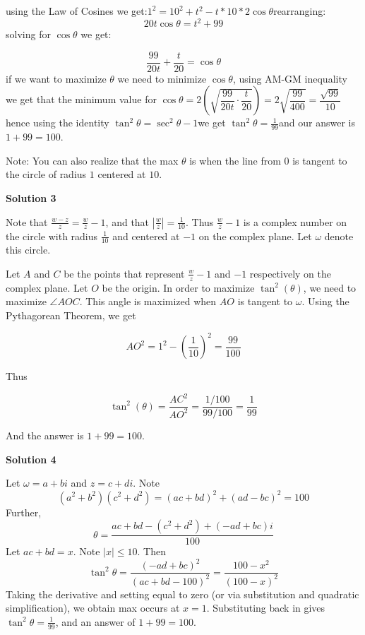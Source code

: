 \begin{enumerate}
 using the Law of Cosines we get:$1^2=10^2+t^2-t*10*2\cos\theta$rearranging:
 \[20t\cos\theta=t^2+99\]solving for $\cos\theta$ we get:

 
 \[\frac{99}{20t}+\frac{t}{20}=\cos\theta\]if we want to maximize $\theta$ we need to minimize $\cos\theta$, using AM-GM inequality we get that the minimum value for $\cos\theta= 2\left(\sqrt{\dfrac{99}{20t}\cdot\dfrac{t}{20}}\right)=2\sqrt{\dfrac{99}{400}}=\dfrac{\sqrt{99}}{10}$hence using the identity $\tan^2\theta=\sec^2\theta-1$we get $\tan^2\theta=\frac{1}{99}$and our answer is $1 + 99 = \boxed{100}$.

 Note: You can also realize that the max $\theta$ is when the line from $0$ is tangent to the circle of radius $1$ centered at $10.$




\textbf{Solution 3}

Note that $\frac{w-z}{z}=\frac{w}{z}-1$, and that $\left|\frac{w}{z}\right|=\frac{1}{10}$. Thus $\frac{w}{z}-1$ is a complex number on the circle with radius $\frac{1}{10}$ and centered at $-1$ on the complex plane. Let $\omega$ denote this circle. 

 Let $A$ and $C$ be the points that represent $\frac{w}{z}-1$ and $-1$ respectively on the complex plane. Let $O$ be the origin. In order to maximize $\tan^2(\theta)$, we need to maximize $\angle{AOC}$. This angle is maximized when $AO$ is tangent to $\omega$. Using the Pythagorean Theorem, we get 

 
 \[AO^2=1^2-\left(\frac{1}{10}\right)^2=\frac{99}{100}\]

 Thus

 
 \[\tan^2(\theta)=\frac{AC^2}{AO^2}=\frac{1/100}{99/100}=\frac{1}{99}\]

 And the answer is $1+99=\boxed{100}$.

 



\textbf{Solution 4}

Let $\omega = a+bi$ and $z = c+di$. Note 
 \[(a^2+b^2)(c^2+d^2) =(ac+bd)^2 + (ad-bc)^2 =  100\] Further, 
 \[\theta = \dfrac{ac+bd - (c^2+d^2) + (-ad + bc)i}{100}\] Let $ac+bd = x$. Note $|x| \leq 10$. Then 
 \[\tan^2{\theta}= \frac{(-ad+bc)^2}{(ac+bd-100)^2} = \frac{100-x^2}{(100-x)^2}\] Taking the derivative and setting equal to zero (or via substitution and quadratic simplification), we obtain max occurs at $x = 1$. Substituting back in gives $\tan^2\theta = \frac{1}{99}$, and an answer of $1+99=\boxed{100}$.

 




\end{enumerate}
